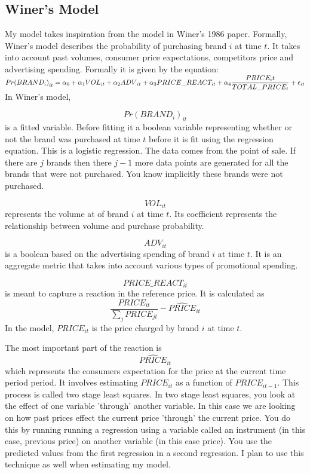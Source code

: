 \documentclass{article}
\begin{document}
\subsection{Winer's Model}
My model takes inspiration from the model in Winer's 1986 paper. Formally, Winer's model describes the probability of purchasing brand $i$ at time $t$. It takes into account past volumes,  consumer price expectations, competitors price and advertising spending. Formally it is given by the equation: \\

$ {Pr(BRAND_i)}_{it} = \alpha_0 + \alpha_1 {VOL}_{it} + \alpha_2 {ADV}_{it} +  \alpha_3 PRICE\_REACT_{it}  \medskip + \alpha_4 \dfrac{PRICE_it}{TOTAL\_PRICE_{t}} + \epsilon_{it}$\\

In Winer's model,

$${Pr(BRAND_i)}_{it} $$ is a fitted variable. Before fitting it a boolean variable representing whether or not the brand was purchased at time $t$ before it is fit using the regression equation. This is a logistic regression. The data comes from the point of sale. If there are $j$ brands then there $j-1$ more data points are generated for all the brands that were not purchased. You know implicitly these brands were not purchased.

$$VOL_{it}$$ represents the volume at of brand $i$ at time $t$. Its coefficient represents the relationship between volume and purchase probability.

$$ADV_{it}$$ is a boolean based on the advertising spending of brand $i$ at time $t$. It is an aggregate metric that takes into account various types of promotional spending.

$$PRICE\_REACT_{it}$$ is meant to capture a reaction in the reference price. It is calculated as $$\dfrac{PRICE_{it}} {\sum_j PRICE_{jt}} - \widehat{PRICE}_{it}$$ In the model, ${PRICE}_{it}$ is the price charged by brand $i$ at time $t$. 

The most important part of the reaction is $$\widehat{PRICE}_{it}$$ which represents the consumers expectation for the price at the current time period period. It involves estimating ${PRICE}_{it}$ as a function of ${PRICE}_{it-1}$. This process is called two stage least squares. In two stage least squares, you look at the effect of one variable 'through' another variable.  In this case we are looking on how past prices effect the current price 'through' the current price. You do this by running running a regression using a variable called an instrument (in this case, previous price) on another variable (in this case price). You use the predicted values from the first regression in a second regression.  I plan to use this technique as well when estimating my model.
\end{document}
